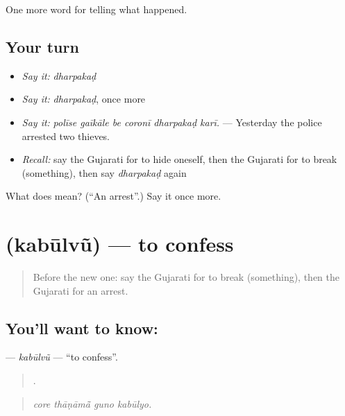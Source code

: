 \begin{grammarlens}[title={What you've built}]
One more word for telling what happened.
\end{grammarlens}

\subsection*{Your turn}
\begin{itemize}
\raggedright
  \item \emph{Say it:} \emph{dharpakaḍ}
  \item \emph{Say it:} \emph{dharpakaḍ}, once more
  \item \emph{Say it:} \emph{polīse gaīkāle be coronī dharpakaḍ karī.} — Yesterday the police arrested two thieves.
  \item \emph{Recall:} say the Gujarati for to hide oneself, then the Gujarati for to break (something), then say \emph{dharpakaḍ} again
\end{itemize}

\begin{tcolorbox}[breakable,colback=teal!4,colframe=teal!35!black,title={Before you move on}]
What does  mean? (\textquotedblleft{}An arrest\textquotedblright{}.) Say it once more.
\end{tcolorbox}
\section[\texorpdfstring{\gu{કબૂલવું} (kabūlvũ)}{કબૂલવું (kabūlvũ)}]{ (kabūlvũ) — to confess}

\label{lesson:GU-C288-kabulvu}



\begin{quote}
Before the new one: say the Gujarati for to break (something), then the Gujarati for an arrest.
\end{quote}

\subsection*{You'll want to know: }
\textbf{} — \emph{kabūlvũ} — \textquotedblleft{}to confess\textquotedblright{}.

\begin{quote}
   .
\end{quote}

\begin{quote}
\emph{core thāṇāmā̃ guno kabūlyo.}
\end{quote}

